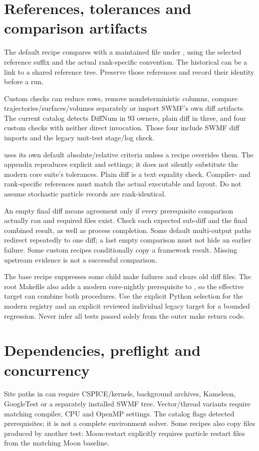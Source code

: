 \section{References, tolerances and comparison artifacts}
The default recipe compares
 with a maintained file under
, using the selected reference suffix and the actual
rank-specific  convention. The historical  can be
a link to a shared reference tree. Preserve those references and record their
identity before a run.

Custom checks can reduce rows, remove nondeterministic columns, compare
trajectories/surfaces/volumes separately or import SWMF's own diff artifacts.
The current catalog detects DiffNum in 93 owners, plain diff in three,
and four custom checks with neither direct invocation. Those four include
SWMF diff imports and the legacy unit-test stage/log check.

 uses its own default absolute/relative
criteria unless a recipe overrides them. The appendix reproduces explicit
 and  settings; it does not silently substitute the
modern core suite's tolerances. Plain diff is a text equality check.
Compiler- and rank-specific references must match the actual executable and
layout. Do not assume stochastic particle records are rank-identical.

An empty final diff means agreement only if every prerequisite comparison
actually ran and required files exist. Check each expected sub-diff and the
final combined result, as well as process completion. Some default
multi-output paths redirect repeatedly to one diff; a last empty comparison
must not hide an earlier failure. Some custom recipes conditionally copy a
framework result. Missing upstream evidence is not a successful comparison.

The base  recipe suppresses some child make failures and
clears old diff files. The root Makefile also adds a modern core-nightly
prerequisite to , so the effective target can combine both
procedures. Use the explicit Python selection for the modern registry and an
explicit reviewed individual legacy target for a bounded regression.
Never infer all tests passed solely from the outer make return code.

\section{Dependencies, preflight and concurrency}
Site paths in  can require CSPICE/kernels, background archives,
Kameleon, GoogleTest or a separately installed SWMF tree. Vector/thread
variants require matching compiler, CPU and OpenMP settings. The catalog
flags detected prerequisites; it is not a complete environment solver.
Some recipes also copy files produced by another test: Moon-restart explicitly
requires particle restart files from the matching Moon baseline.

